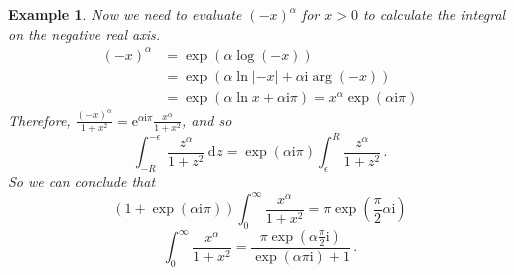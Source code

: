 \documentclass{article}
\theoremstyle{plain}\theoremheaderfont{\normalfont\itshape}\theorembodyfont{\rmfamily}\theoremseparator{.}\newtheorem*{rem}{Remark}\newtheorem*{ex}{Example}\newtheorem*{proof}{Proof}\newtheorem*{altp}{Alternative proof}\newtheorem*{con}{Consequences}\newtheorem*{notn}{Notations}\newtheorem*{cau}{Caution}\newtheorem*{term}{Terminology}\newtheorem*{keyex}{Key example}
\theoremstyle{plain}\theoremheaderfont{\normalfont\bfseries}\theorembodyfont{\rmfamily}\theoremseparator{.}\newtheorem{thm}{Theorem}[section]\newtheorem{lem}[thm]{Lemma}\newtheorem{prop}[thm]{Proposition}\newtheorem*{cor}{Corollary}\newtheorem{defn}[thm]{Definition}\newtheorem{clm}[thm]{Claim}\newtheorem{clminproof}{Claim}\newtheorem{leminproof}{Lemma}\newtheorem{app}{Application}
\theoremstyle{break}\theoremheaderfont{\normalfont\itshape}\theorembodyfont{\rmfamily}\theoremseparator{.\medskip}\newtheorem*{proofskip}{Proof}\newtheorem*{exs}{Examples}\newtheorem*{rems}{Remarks}\newtheorem*{rec}{Recall}\newtheorem*{ppts}{Properties}
\theoremstyle{break}\theoremheaderfont{\normalfont\bfseries}\theorembodyfont{\rmfamily}\theoremseparator{.\medskip}\newtheorem{lemskip}[thm]{Lemma}\newtheorem{defnskip}[thm]{Definition}\newtheorem{propskip}[thm]{Proposition}\newtheorem{thmskip}[thm]{Theorem}
\numberwithin{equation}{section}
\newcommand{\ii}{\mathrm{i}}
\newcommand{\ee}{\mathrm{e}}
\newcommand{\abs}[1]{\left|#1\right|}
\newcommand{\dd}[2][]{\,\mathrm{d}^{#1} #2}
\begin{document}
\begin{ex}
        Now we need to evaluate \((-x)^\alpha\) for \(x>0\) to calculate the integral on the negative real axis.
        \begin{align*}
            (-x)^\alpha&=\exp(\alpha\log(-x))\\
            &=\exp(\alpha\ln\abs{-x}+\alpha \ii\arg(-x))\\
            &=\exp(\alpha\ln x+\alpha \ii\pi)=x^\alpha\exp(\alpha \ii\pi)
        \end{align*}
        Therefore, \(\frac{(-x)^\alpha}{1+x^2}=\ee^{\alpha \ii\pi}\frac{x^\alpha}{1+x^2}\), and so
        \[\int_{-R}^{-\epsilon}\frac{z^\alpha}{1+z^2}\dd{z}=\exp(\alpha \ii\pi)\int_{\epsilon}^{R}\frac{z^\alpha}{1+z^2}\,.\]
        So we can conclude that
        \[(1+\exp(\alpha \ii\pi))\int_{0}^{\infty}\frac{x^\alpha}{1+x^2}=\pi\exp\left(\frac{\pi}{2}\alpha \ii\right)\]
        \[\int_{0}^{\infty}\frac{x^\alpha}{1+x^2}=\frac{\pi\exp(\alpha\frac{\pi}{2} \ii)}{\exp(\alpha\pi \ii)+1}\,.\]
    \end{ex}
\end{document}
